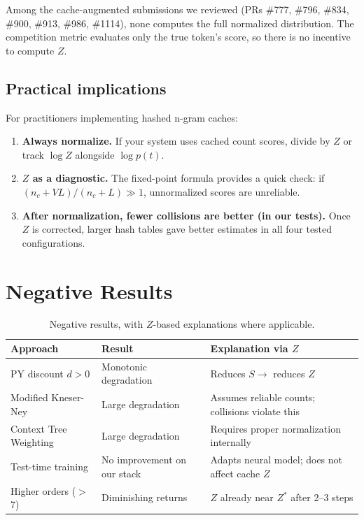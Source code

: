 \documentclass[11pt]{article}
\begin{document}
Among the cache-augmented submissions we reviewed (PRs \#777, \#796, \#834, \#900, \#913, \#986, \#1114), none computes the full normalized distribution. The competition metric evaluates only the true token's score, so there is no incentive to compute $Z$.

\subsection{Practical implications}

For practitioners implementing hashed n-gram caches:
\begin{enumerate}
\item \textbf{Always normalize.} If your system uses cached count scores, divide by $Z$ or track $\log Z$ alongside $\log p(t)$.
\item \textbf{$Z$ as a diagnostic.} The fixed-point formula provides a quick check: if $(n_c + VL)/(n_c + L) \gg 1$, unnormalized scores are unreliable.
\item \textbf{After normalization, fewer collisions are better (in our tests).} Once $Z$ is corrected, larger hash tables gave better estimates in all four tested configurations.
\end{enumerate}

\section{Negative Results}

\begin{table}[h]
\centering
\caption{Negative results, with $Z$-based explanations where applicable.}
\label{tab:negative}
\begin{tabular}{lll}
\toprule
Approach & Result & Explanation via $Z$ \\
\midrule
PY discount $d > 0$ & Monotonic degradation & Reduces $S \to$ reduces $Z$ \\
Modified Kneser-Ney & Large degradation & Assumes reliable counts; collisions violate this \\
Context Tree Weighting & Large degradation & Requires proper normalization internally \\
Test-time training & No improvement on our stack & Adapts neural model; does not affect cache $Z$ \\
Higher orders ($>$7) & Diminishing returns & $Z$ already near $Z^*$ after 2--3 steps \\
\bottomrule
\end{tabular}
\end{table}
\end{document}
